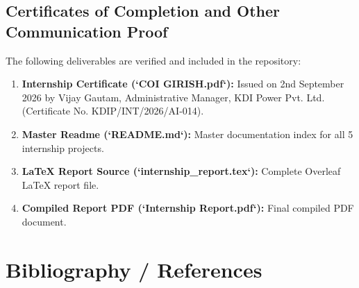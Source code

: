 \documentclass[12pt,a4paper]{report}
\begin{document}
\section{Certificates of Completion and Other Communication Proof}

The following deliverables are verified and included in the repository:

\begin{enumerate}[leftmargin=*,itemsep=3pt]
    \item \textbf{Internship Certificate (`COI GIRISH.pdf`):} Issued on 2nd September 2026 by Vijay Gautam, Administrative Manager, KDI Power Pvt. Ltd. (Certificate No. KDIP/INT/2026/AI-014).
    \item \textbf{Master Readme (`README.md`):} Master documentation index for all 5 internship projects.
    \item \textbf{LaTeX Report Source (`internship_report.tex`):} Complete Overleaf LaTeX report file.
    \item \textbf{Compiled Report PDF (`Internship Report.pdf`):} Final compiled PDF document.
\end{enumerate}

\chapter{Bibliography / References}
\end{document}
